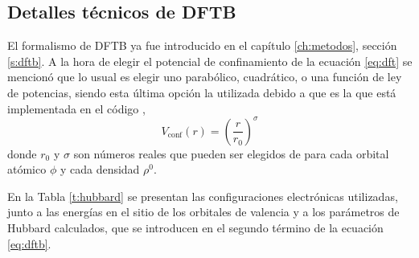 \subsection{Detalles técnicos de DFTB}\label{ss:dftb}

El formalismo de DFTB ya fue introducido en el capítulo \ref{ch:metodos}, 
sección \ref{s:dftb}. A la hora de elegir el potencial de confinamiento de la
ecuación \ref{eq:dft} se mencionó que lo usual es elegir uno parabólico, 
cuadrático, o una función de ley de potencias, siendo esta última opción la 
utilizada debido a que es la que está implementada en el código 
\cite{hotcent},
\begin{equation}\label{eq:vconf}
    V_{\text{conf}}(r)=\left(\frac{r}{r_0}\right)^{\sigma}
\end{equation}
donde $r_0$ y $\sigma$ son números reales que pueden ser elegidos de para cada 
orbital atómico $\phi$ y cada densidad $\rho^0$.

En la Tabla \ref{t:hubbard} se presentan las configuraciones electrónicas 
utilizadas, junto a las energías en el sitio de los orbitales de valencia y a 
los parámetros de Hubbard calculados, que se introducen en el segundo término
de la ecuación \ref{eq:dftb}.
\begin{table}[h!]
    \centering
    \caption{Configuraciones electrónicas, energías en el sitio de los orbitales
    de valencia y parámetros de Hubbard calculados con el funcional de intercambio
    y correlación PBE.}
    \setlength\extrarowheight{2pt}
    \label{t:hubbard}
\end{table}

